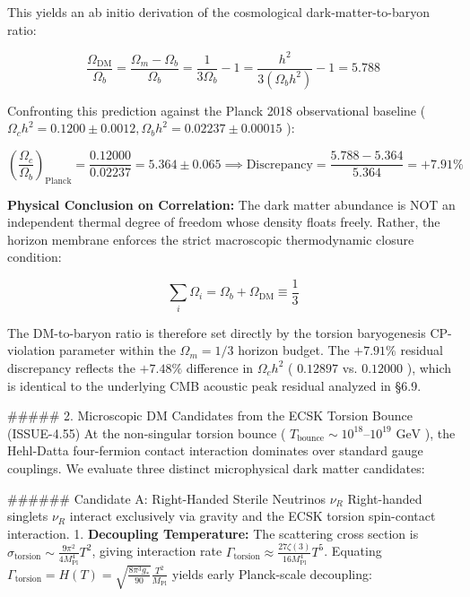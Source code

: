 \documentclass[11pt,a4paper]{article}
\theoremstyle{definition}
\theoremstyle{remark}
\begin{document}
This yields an ab initio derivation of the cosmological dark-matter-to-baryon ratio:


\begin{equation}
\frac{\Omega_{\text{DM}}}{\Omega_b} = \frac{\Omega_m - \Omega_b}{\Omega_b} = \frac{1}{3\Omega_b} - 1 = \frac{h^2}{3(\Omega_b h^2)} - 1 = \mathbf{5.788}
\end{equation}


Confronting this prediction against the Planck 2018 observational baseline ( $\Omega_c h^2 = 0.1200 \pm 0.0012, \Omega_b h^2 = 0.02237 \pm 0.00015$ ):


\begin{equation}
\left(\frac{\Omega_c}{\Omega_b}\right)_{\text{Planck}} = \frac{0.12000}{0.02237} = 5.364 \pm 0.065 \implies \text{Discrepancy} = \frac{5.788 - 5.364}{5.364} = \mathbf{+7.91\%}
\end{equation}


\textbf{Physical Conclusion on Correlation:} The dark matter abundance is NOT an independent thermal degree of freedom whose density floats freely. Rather, the horizon membrane enforces the strict macroscopic thermodynamic closure condition:


\begin{equation}
\sum_i \Omega_i = \Omega_b + \Omega_{\text{DM}} \equiv \frac{1}{3}
\end{equation}


The DM-to-baryon ratio is therefore set directly by the torsion baryogenesis CP-violation parameter within the $\Omega_m = 1/3$ horizon budget. The $+7.91\%$ residual discrepancy reflects the $+7.48\%$ difference in $\Omega_c h^2$ ( $0.12897$ vs. $0.12000$ ), which is identical to the underlying CMB acoustic peak residual analyzed in \S 6.9.

\#\#\#\#\# 2. Microscopic DM Candidates from the ECSK Torsion Bounce (ISSUE-4.55)
At the non-singular torsion bounce ( $T_{\text{bounce}} \sim 10^{18}\text{--}10^{19}\text{ GeV}$ ), the Hehl-Datta four-fermion contact interaction dominates over standard gauge couplings. We evaluate three distinct microphysical dark matter candidates:

\#\#\#\#\#\# Candidate A: Right-Handed Sterile Neutrinos $\nu_R$
Right-handed singlets $\nu_R$ interact exclusively via gravity and the ECSK torsion spin-contact interaction.
1. \textbf{Decoupling Temperature:} The scattering cross section is $\sigma_{\text{torsion}} \sim \frac{9\pi^2}{4 M_{\text{Pl}}^4} T^2$, giving interaction rate $\Gamma_{\text{torsion}} \approx \frac{27\zeta(3)}{16 M_{\text{Pl}}^4} T^5$. Equating $\Gamma_{\text{torsion}} = H(T) = \sqrt{\frac{8\pi^3 g_*}{90}}\frac{T^2}{M_{\text{Pl}}}$ yields early Planck-scale decoupling:
\end{document}
